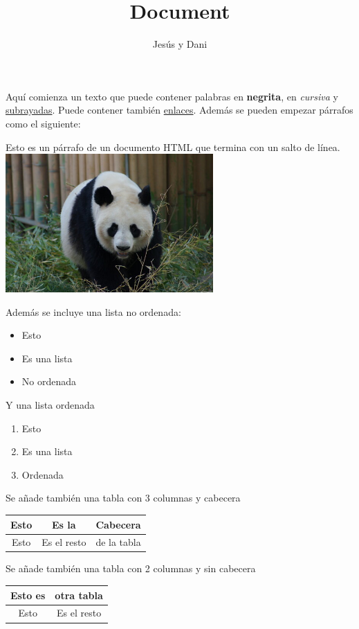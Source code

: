 \documentclass[12pt]{article}
\title{Document}
\author{Jesús y Dani}
\begin{document}
Aquí comienza un texto que puede contener palabras en \textbf{negrita}, en \textit{cursiva} y \underline{subrayadas}. 
Puede contener también \href{https://ejemplo.com"}{enlaces}.
Además se pueden empezar párrafos como el siguiente:

Esto es un párrafo de un documento HTML que termina con un salto de línea.\\


\includegraphics[width=300px, height=200px]{image.png}

Además se incluye una lista no ordenada:
\begin{itemize}
	\item Esto
	\item Es una lista
	\item No ordenada
\end{itemize}


Y una lista ordenada
\begin{enumerate}
	\item Esto
	\item Es una lista
	\item Ordenada
\end{enumerate}


Se añade también una tabla con 3 columnas y cabecera

\begin{tabular}{|c|c|c|}
	\hline
	\textbf{Esto} & \textbf{Es la} & \textbf{Cabecera} \\
	\hline
	Esto & Es el resto & de la tabla \\
	\hline
\end{tabular}


Se añade también una tabla con 2 columnas y sin cabecera 

\begin{tabular}{|c|c|}
	\hline
	Esto es & otra tabla \\
	\hline
	Esto & Es el resto \\
	\hline
\end{tabular}
\end{document}
